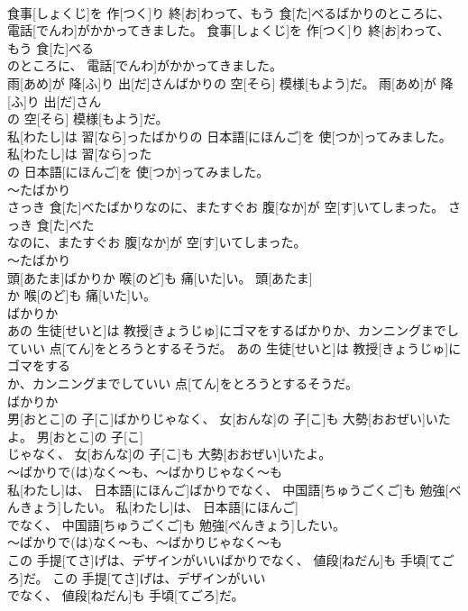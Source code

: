 \documentclass[8pt]{extreport}
\begin{document}
\begin{CJK}{UTF8}{min}
\\	食事[しょくじ]を 作[つく]り 終[お]わって、もう 食[た]べるばかりのところに、 電話[でんわ]がかかってきました。	食事[しょくじ]を 作[つく]り 終[お]わって、もう 食[た]べる
\\	のところに、 電話[でんわ]がかかってきました。	
\\	雨[あめ]が 降[ふ]り 出[だ]さんばかりの 空[そら] 模様[もよう]だ。	雨[あめ]が 降[ふ]り 出[だ]さん
\\	の 空[そら] 模様[もよう]だ。	
\\	私[わたし]は 習[なら]ったばかりの 日本語[にほんご]を 使[つか]ってみました。	私[わたし]は 習[なら]った
\\	の 日本語[にほんご]を 使[つか]ってみました。	
\\	～たばかり 
\\	さっき 食[た]べたばかりなのに、またすぐお 腹[なか]が 空[す]いてしまった。	さっき 食[た]べた
\\	なのに、またすぐお 腹[なか]が 空[す]いてしまった。	
\\	～たばかり 
\\	頭[あたま]ばかりか 喉[のど]も 痛[いた]い。	頭[あたま]
\\	か 喉[のど]も 痛[いた]い。	
\\	ばかりか
\\	あの 生徒[せいと]は 教授[きょうじゅ]にゴマをするばかりか、カンニングまでしていい 点[てん]をとろうとするそうだ。	あの 生徒[せいと]は 教授[きょうじゅ]にゴマをする
\\	か、カンニングまでしていい 点[てん]をとろうとするそうだ。	
\\	ばかりか
\\	男[おとこ]の 子[こ]ばかりじゃなく、 女[おんな]の 子[こ]も 大勢[おおぜい]いたよ。	男[おとこ]の 子[こ]
\\	じゃなく、 女[おんな]の 子[こ]も 大勢[おおぜい]いたよ。	
\\	～ばかりで(は)なく～も、～ばかりじゃなく～も
\\	私[わたし]は、 日本語[にほんご]ばかりでなく、 中国語[ちゅうごくご]も 勉強[べんきょう]したい。	私[わたし]は、 日本語[にほんご]
\\	でなく、 中国語[ちゅうごくご]も 勉強[べんきょう]したい。	
\\	～ばかりで(は)なく～も、～ばかりじゃなく～も
\\	この 手提[てさ]げは、デザインがいいばかりでなく、 値段[ねだん]も 手頃[てごろ]だ。	この 手提[てさ]げは、デザインがいい
\\	でなく、 値段[ねだん]も 手頃[てごろ]だ。	

\end{CJK}
\end{document}
